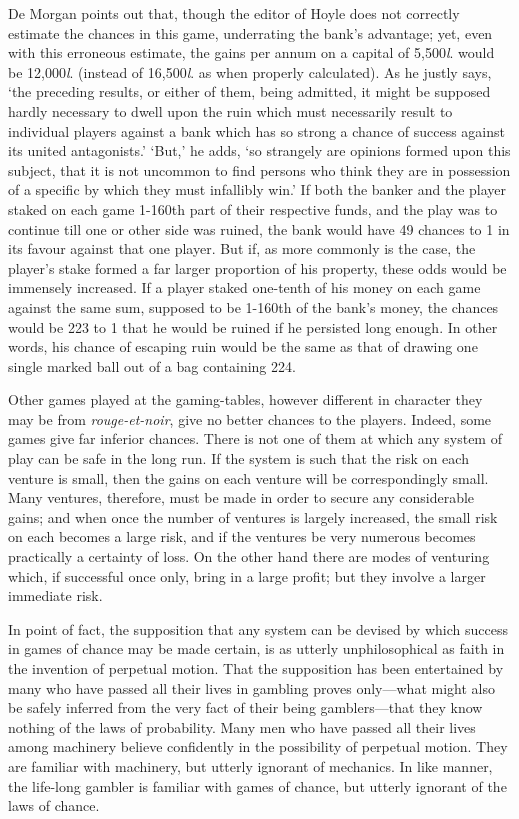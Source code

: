 \documentclass[letterpaper,12pt,oneside,openany]{memoir}
\begin{document}
De Morgan points out that, though the editor of
Hoyle does not correctly estimate the chances in this
game, underrating the bank's advantage; yet, even
with this erroneous estimate, the gains per annum on a
capital of 5,500\textit{l}. would be 12,000\textit{l}. (instead of 16,500\textit{l}.
as when properly calculated). As he justly says, `the
preceding results, or either of them, being admitted,
it might be supposed hardly necessary to dwell upon
the ruin which must necessarily result to individual
players against a bank which has so strong a chance of
success against its united antagonists.' `But,' he adds,
`so strangely are opinions formed upon this subject,
that it is not uncommon to find persons who think they
are in possession of a specific by which they must infallibly
win.' If both the banker and the player staked
on each game 1-160th part of their respective funds,
and the play was to continue till one or other side was
ruined, the bank would have 49 chances to 1 in its
favour against that one player. But if, as more commonly
is the case, the player's stake formed a far larger
proportion of his property, these odds would be immensely
increased. If a player staked one-tenth of his
money on each game against the same sum, supposed
to be 1-160th of the bank's money, the chances would
be 223 to 1 that he would be ruined if he persisted
long enough. In other words, his chance of escaping
ruin would be the same as that of drawing one single
marked ball out of a bag containing 224.

Other games played at the gaming-tables, however
different in character they may be from \textit{rouge-et-noir},
give no better chances to the players. Indeed, some
games give far inferior chances. There is not one of
them at which any system of play can be safe in the
long run. If the system is such that the risk on each
venture is small, then the gains on each venture will
be correspondingly small. Many ventures, therefore,
must be made in order to secure any considerable
gains; and when once the number of ventures is
largely increased, the small risk on each becomes a
large risk, and if the ventures be very numerous
becomes practically a certainty of loss. On the other
hand there are modes of venturing which, if successful
once only, bring in a large profit; but they involve a
larger immediate risk.

In point of fact, the supposition that any system
can be devised by which success in games of chance
may be made certain, is as utterly unphilosophical as
faith in the invention of perpetual motion. That the
supposition has been entertained by many who have
passed all their lives in gambling proves only---what
might also be safely inferred from the very fact of their
being gamblers---that they know nothing of the laws
of probability. Many men who have passed all their
lives among machinery believe confidently in the possibility
of perpetual motion. They are familiar with
machinery, but utterly ignorant of mechanics. In like
manner, the life-long gambler is familiar with games
of chance, but utterly ignorant of the laws of chance.
\end{document}
